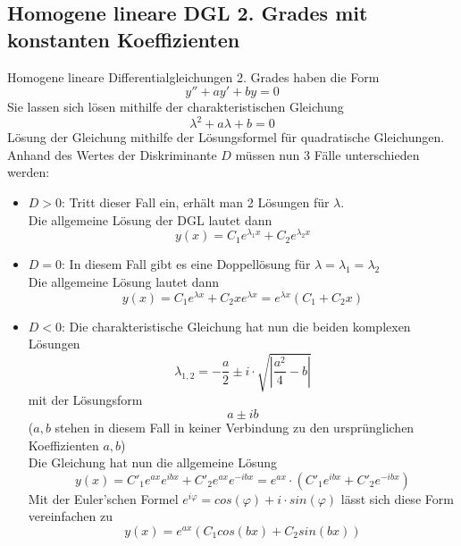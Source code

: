 \documentclass[a4paper,11pt]{article}
\begin{document}
	\subsection{Homogene lineare DGL 2. Grades mit konstanten Koeffizienten} %
	Homogene lineare Differentialgleichungen 2. Grades haben die Form
	\begin{equation}
		y'' + ay' + by = 0
	\end{equation}
	Sie lassen sich lösen mithilfe der charakteristischen Gleichung
	\begin{equation}
		\lambda^2 + a\lambda + b = 0
	\end{equation}
	Lösung der Gleichung mithilfe der Lösungsformel für quadratische Gleichungen. Anhand des Wertes der Diskriminante $D$ 
	müssen nun 3 Fälle unterschieden werden:
	\begin{itemize}
		
		\item $D > 0$:
			Tritt dieser Fall ein, erhält man 2 Lösungen für $\lambda$.\\
			Die allgemeine Lösung der DGL lautet dann
			\begin{equation}
				y(x) = C_1 e^{\lambda_1 x} + C_2 e^{\lambda_2 x}
			\end{equation} 
		
		\item $D = 0$: 
			In diesem Fall gibt es eine Doppellösung für $\lambda = \lambda_1 = \lambda_2$\\
			Die allgemeine Lösung lautet dann
			\begin{equation}
				y(x) = C_1 e^{\lambda x} + C_2 xe^{\lambda x} = e^{\lambda x}(C_1+C_2 x)
			\end{equation}
		
		\item $D < 0$:
			Die charakteristische Gleichung hat nun die beiden komplexen Lösungen 
			\begin{equation}
				\lambda_{1,2} = -\frac{a}{2} \pm i \cdot \sqrt{\left| \frac{a^2}{4}-b\right|}
			\end{equation}
			mit der Lösungsform
			\begin{equation}
				a \pm ib
			\end{equation}
			($a,b$ stehen in diesem Fall in keiner Verbindung zu den ursprünglichen Koeffizienten $a,b$)\\
			Die Gleichung hat nun die allgemeine Lösung 
			\begin{equation}
				y(x) = C'_1 e^{ax}e^{ibx} + C'_2 e^{ax}e^{-ibx} = e^{ax} \cdot (C'_1 e^{ibx}+C'_2 e^{-ibx})
			\end{equation}
			Mit der Euler'schen Formel $e^{i\varphi} = cos(\varphi)+i \cdot sin(\varphi)$ lässt sich diese Form vereinfachen zu 
			\begin{equation}
				y(x) = e^{ax}(C_1 cos(bx) + C_2 sin(bx))
			\end{equation}
	\end{itemize}
	
\end{document}
